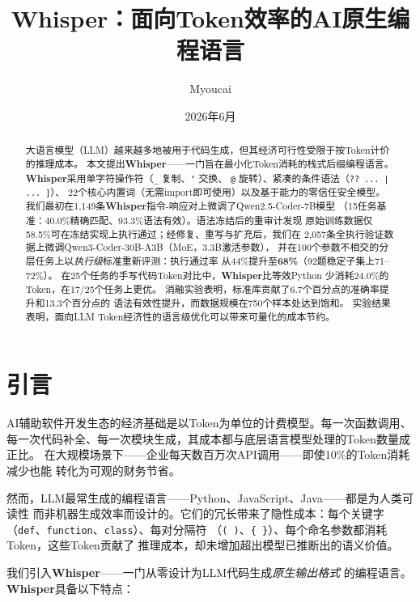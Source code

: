\documentclass[11pt,a4paper]{ctexart}
\title{\bfseries Whisper：面向Token效率的AI原生编程语言}
\author[1]{Myoucai}
\affil[1]{独立研究者}
\date{2026年6月}
\begin{document}
\maketitle

\begin{abstract}
大语言模型（LLM）越来越多地被用于代码生成，但其经济可行性受限于按Token计价的推理成本。
本文提出\textbf{Whisper}——一门旨在最小化Token消耗的栈式后缀编程语言。
\textbf{Whisper}采用单字符操作符（\texttt{\_} 复制、\texttt{`} 交换、
\texttt{@} 旋转）、紧凑的条件语法（\texttt{?? ... | ... ]}）、
22个核心内置词（无需import即可使用）以及基于能力的零信任安全模型。
我们最初在1,149条\textbf{Whisper}指令-响应对上微调了Qwen2.5-Coder-7B模型
（15任务基准：40.0\%精确匹配、93.3\%语法有效）。语法冻结后的重审计发现
原始训练数据仅58.5\%可在冻结实现上执行通过；经修复、重写与扩充后，我们在
2,057条全执行验证数据上微调Qwen3-Coder-30B-A3B（MoE，3.3B激活参数），
并在100个参数不相交的分层任务上以\emph{执行级}标准重新评测：执行通过率
从44\%提升至\textbf{68\%}（92题稳定子集上71--72\%）。
在25个任务的手写代码Token对比中，\textbf{Whisper}比等效Python
少消耗24.0\%的Token，在17/25个任务上更优。
消融实验表明，标准库贡献了6.7个百分点的准确率提升和13.3个百分点的
语法有效性提升，而数据规模在750个样本处达到饱和。
实验结果表明，面向LLM Token经济性的语言级优化可以带来可量化的成本节约。
\end{abstract}

\section{引言}

AI辅助软件开发生态的经济基础是以Token为单位的计费模型。每一次函数调用、
每一次代码补全、每一次模块生成，其成本都与底层语言模型处理的Token数量成正比。
在大规模场景下——企业每天数百万次API调用——即使10\%的Token消耗减少也能
转化为可观的财务节省。

然而，LLM最常生成的编程语言——Python、JavaScript、Java——都是为人类可读性
而非机器生成效率而设计的。它们的冗长带来了隐性成本：每个关键字
（\texttt{def}、\texttt{function}、\texttt{class}）、每对分隔符
（\texttt{( )}、\texttt{\{ \}}）、每个命名参数都消耗Token，这些Token贡献了
推理成本，却未增加超出模型已推断出的语义价值。

我们引入\textbf{Whisper}——一门从零设计为LLM代码生成\textit{原生输出格式}
的编程语言。\textbf{Whisper}具备以下特点：
\end{document}
